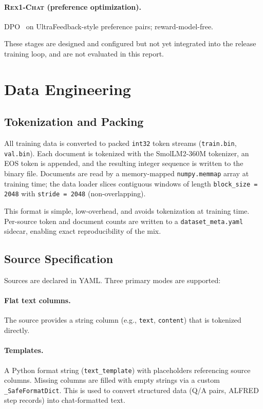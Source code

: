 \documentclass[11pt,a4paper]{article}
\begin{document}
\paragraph{\textsc{Rex1-Chat} (preference optimization).}
DPO~\cite{dpo} on UltraFeedback-style preference pairs; reward-model-free.

These stages are designed and configured but not yet integrated into the
release training loop, and are not evaluated in this report.

\section{Data Engineering}

\subsection{Tokenization and Packing}

All training data is converted to packed \texttt{int32} token streams
(\texttt{train.bin}, \texttt{val.bin}). Each document is tokenized with the
SmolLM2-360M tokenizer, an EOS token is appended, and the resulting integer
sequence is written to the binary file. Documents are read by a
memory-mapped \texttt{numpy.memmap} array at training time; the data loader
slices contiguous windows of length \texttt{block\_size = 2048} with
\texttt{stride = 2048} (non-overlapping).

This format is simple, low-overhead, and avoids tokenization at training
time. Per-source token and document counts are written to a
\texttt{dataset\_meta.yaml} sidecar, enabling exact reproducibility of the
mix.

\subsection{Source Specification}

Sources are declared in YAML. Three primary modes are supported:

\paragraph{Flat text columns.}
The source provides a string column (e.g., \texttt{text}, \texttt{content})
that is tokenized directly.

\paragraph{Templates.}
A Python format string (\texttt{text\_template}) with placeholders
referencing source columns. Missing columns are filled with empty strings
via a custom \texttt{\_SafeFormatDict}. This is used to convert structured
data (Q/A pairs, ALFRED step records) into chat-formatted text.
\end{document}

